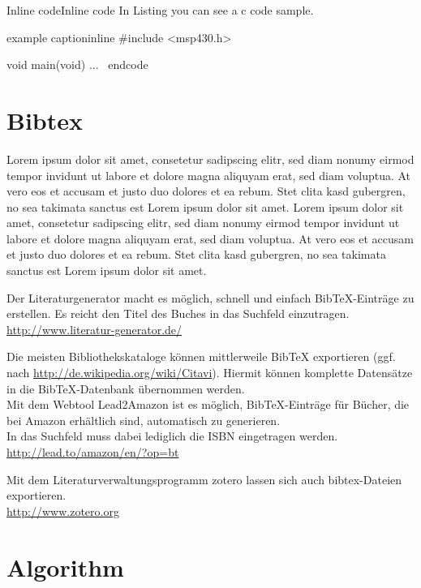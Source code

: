 \begin{code}[tex]{Inline code}{Inline code}
In Listing  you can see a c code sample.

\begin{code}[c]{example caption}{inline}
#include <msp430.h> 

void main(void) {
...
}
\ end{code}
\end{code}

\section{Bibtex}

Lorem ipsum dolor sit amet, consetetur sadipscing elitr, sed diam nonumy eirmod tempor invidunt ut labore et dolore magna aliquyam erat, sed diam voluptua. At vero eos et accusam et justo duo dolores et ea rebum. Stet clita kasd gubergren, no sea takimata sanctus est Lorem ipsum dolor sit amet. Lorem ipsum dolor sit amet, consetetur sadipscing elitr, sed diam nonumy eirmod tempor invidunt ut labore et dolore magna aliquyam erat, sed diam voluptua. At vero eos et accusam et justo duo dolores et ea rebum. Stet clita kasd gubergren, no sea takimata sanctus est Lorem ipsum dolor sit amet. \cite{bibtex.a}

Der Literaturgenerator macht es möglich, schnell und einfach BibTeX-Einträge zu erstellen.
Es reicht den Titel des Buches in das Suchfeld einzutragen.\\
\url{http://www.literatur-generator.de/}

Die meisten Bibliothekskataloge können mittlerweile BibTeX exportieren (ggf. nach \url{http://de.wikipedia.org/wiki/Citavi}). Hiermit können komplette Datensätze in die BibTeX-Datenbank übernommen werden.\\
Mit dem Webtool Lead2Amazon ist es möglich, BibTeX-Einträge für Bücher, die bei Amazon erhältlich sind, automatisch zu generieren.\\
In das Suchfeld muss dabei lediglich die ISBN eingetragen werden.\\
\url{http://lead.to/amazon/en/?op=bt}

Mit dem Literaturverwaltungsprogramm zotero lassen sich auch bibtex-Dateien exportieren.\\
\url{http://www.zotero.org}

\section{Algorithm}


\end{code}
